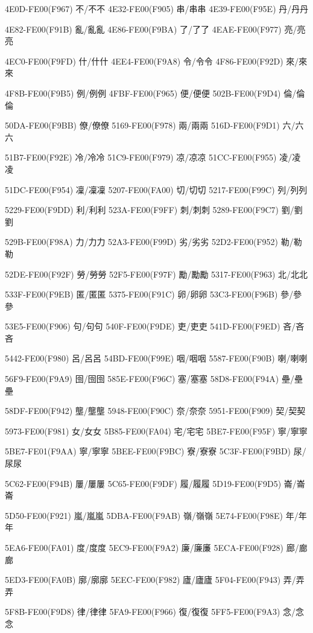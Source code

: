 4E0D-FE00(F967) 不/不︀不 
4E32-FE00(F905) 串/串︀串 
4E39-FE00(F95E) 丹/丹︀丹\par
4E82-FE00(F91B) 亂/亂︀亂 
4E86-FE00(F9BA) 了/了︀了 
4EAE-FE00(F977) 亮/亮︀亮\par
4EC0-FE00(F9FD) 什/什︀什 
4EE4-FE00(F9A8) 令/令︀令 
4F86-FE00(F92D) 來/來︀來\par
4F8B-FE00(F9B5) 例/例︀例 
4FBF-FE00(F965) 便/便︀便 
502B-FE00(F9D4) 倫/倫︀倫\par
50DA-FE00(F9BB) 僚/僚︀僚 
5169-FE00(F978) 兩/兩︀兩 
516D-FE00(F9D1) 六/六︀六\par
51B7-FE00(F92E) 冷/冷︀冷 
51C9-FE00(F979) 凉/凉︀凉 
51CC-FE00(F955) 凌/凌︀凌\par
51DC-FE00(F954) 凜/凜︀凜 
5207-FE00(FA00) 切/切︀切 
5217-FE00(F99C) 列/列︀列\par
5229-FE00(F9DD) 利/利︀利 
523A-FE00(F9FF) 刺/刺︀刺 
5289-FE00(F9C7) 劉/劉︀劉\par
529B-FE00(F98A) 力/力︀力 
52A3-FE00(F99D) 劣/劣︀劣 
52D2-FE00(F952) 勒/勒︀勒\par
52DE-FE00(F92F) 勞/勞︀勞 
52F5-FE00(F97F) 勵/勵︀勵 
5317-FE00(F963) 北/北︀北\par
533F-FE00(F9EB) 匿/匿︀匿 
5375-FE00(F91C) 卵/卵︀卵 
53C3-FE00(F96B) 參/參︀參\par
53E5-FE00(F906) 句/句︀句 
540F-FE00(F9DE) 吏/吏︀吏 
541D-FE00(F9ED) 吝/吝︀吝\par
5442-FE00(F980) 呂/呂︀呂 
54BD-FE00(F99E) 咽/咽︀咽 
5587-FE00(F90B) 喇/喇︀喇\par
56F9-FE00(F9A9) 囹/囹︀囹 
585E-FE00(F96C) 塞/塞︀塞 
58D8-FE00(F94A) 壘/壘︀壘\par
58DF-FE00(F942) 壟/壟︀壟 
5948-FE00(F90C) 奈/奈︀奈 
5951-FE00(F909) 契/契︀契\par
5973-FE00(F981) 女/女︀女 
5B85-FE00(FA04) 宅/宅︀宅 
5BE7-FE00(F95F) 寧/寧︀寧\par
5BE7-FE01(F9AA) 寧/寧︁寧 
5BEE-FE00(F9BC) 寮/寮︀寮 
5C3F-FE00(F9BD) 尿/尿︀尿\par
5C62-FE00(F94B) 屢/屢︀屢 
5C65-FE00(F9DF) 履/履︀履 
5D19-FE00(F9D5) 崙/崙︀崙\par
5D50-FE00(F921) 嵐/嵐︀嵐 
5DBA-FE00(F9AB) 嶺/嶺︀嶺 
5E74-FE00(F98E) 年/年︀年\par
5EA6-FE00(FA01) 度/度︀度 
5EC9-FE00(F9A2) 廉/廉︀廉 
5ECA-FE00(F928) 廊/廊︀廊\par
5ED3-FE00(FA0B) 廓/廓︀廓 
5EEC-FE00(F982) 廬/廬︀廬 
5F04-FE00(F943) 弄/弄︀弄\par
5F8B-FE00(F9D8) 律/律︀律 
5FA9-FE00(F966) 復/復︀復 
5FF5-FE00(F9A3) 念/念︀念\par
